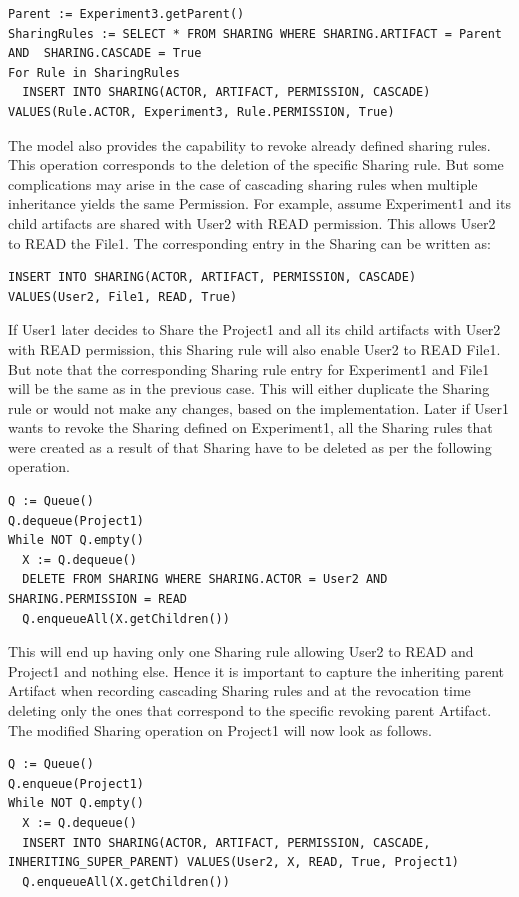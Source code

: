 \documentclass[sigconf]{acmart}
\begin{document}
\begin{lstlisting}
Parent := Experiment3.getParent()
SharingRules := SELECT * FROM SHARING WHERE SHARING.ARTIFACT = Parent AND  SHARING.CASCADE = True
For Rule in SharingRules
  INSERT INTO SHARING(ACTOR, ARTIFACT, PERMISSION, CASCADE) VALUES(Rule.ACTOR, Experiment3, Rule.PERMISSION, True)
\end{lstlisting}

The model also provides the capability to revoke already defined sharing rules. This operation corresponds to the deletion of the specific Sharing rule. But some complications may arise in the case of cascading sharing rules when multiple inheritance yields the same Permission. For example, assume Experiment1 and its child artifacts are shared with User2 with READ permission. This allows User2 to READ the File1. The corresponding entry in the Sharing can be written as:

\begin{lstlisting}
INSERT INTO SHARING(ACTOR, ARTIFACT, PERMISSION, CASCADE) VALUES(User2, File1, READ, True)
\end{lstlisting}

If User1 later decides to Share the Project1 and all its child artifacts with User2 with READ permission, this Sharing rule will also enable User2 to READ File1. But note that the corresponding Sharing rule entry for Experiment1 and File1 will be the same as in the previous case. This will either duplicate the Sharing rule or would not make any changes, based on the implementation. Later if User1 wants to revoke the Sharing defined on Experiment1, all the Sharing rules that were created as a result of that Sharing have to be deleted as per the following operation.

\begin{lstlisting}
Q := Queue()
Q.dequeue(Project1)
While NOT Q.empty()
  X := Q.dequeue()
  DELETE FROM SHARING WHERE SHARING.ACTOR = User2 AND SHARING.PERMISSION = READ
  Q.enqueueAll(X.getChildren())
\end{lstlisting}

This will end up having only one Sharing rule allowing User2 to READ and Project1 and nothing else. Hence it is important to capture the inheriting parent Artifact when recording cascading Sharing rules and at the revocation time deleting only the ones that correspond to the specific revoking parent Artifact. The modified Sharing operation on Project1 will now look as follows.

\begin{lstlisting}
Q := Queue()
Q.enqueue(Project1)
While NOT Q.empty()
  X := Q.dequeue()
  INSERT INTO SHARING(ACTOR, ARTIFACT, PERMISSION, CASCADE, INHERITING_SUPER_PARENT) VALUES(User2, X, READ, True, Project1)
  Q.enqueueAll(X.getChildren())
\end{lstlisting}
\end{document}
